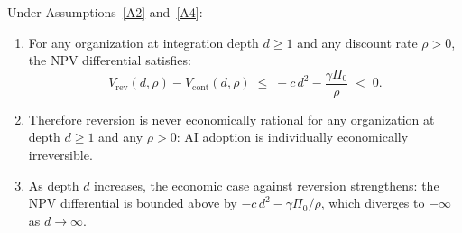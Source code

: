 \begin{theorem}\label{thm:C2}
  Under Assumptions~\ref{A2} and~\ref{A4}:
  \begin{enumerate}
    \item[(i)] For any organization at integration depth $d \geq 1$ and
      any discount rate $\rho > 0$, the NPV differential satisfies:
      \[
        V_{\mathrm{rev}}(d,\rho) - V_{\mathrm{cont}}(d,\rho)
        \;\leq\; -c\,d^2 - \frac{\gamma\Pi_0}{\rho}
        \;<\; 0.
      \]
    \item[(ii)] Therefore reversion is never economically rational for
      any organization at depth $d \geq 1$ and any $\rho > 0$: AI
      adoption is individually economically irreversible.
    \item[(iii)] As depth $d$ increases, the economic case against
      reversion strengthens: the NPV differential is bounded above by
      $-c\,d^2 - \gamma\Pi_0/\rho$, which diverges to $-\infty$ as
      $d \to \infty$.
  \end{enumerate}
\end{theorem}

